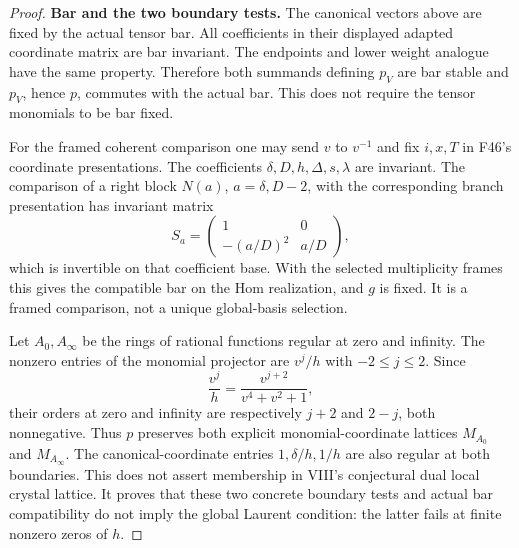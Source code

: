 \documentclass[11pt,a4paper]{article}
\newcommand{\fid}[1]{\textsf{#1}}\newcommand{\gate}[1]{\textsf{#1}}
\theoremstyle{named}\newtheorem{finding}{Finding}[section]
\theoremstyle{definition}\newtheorem{definition}[finding]{Definition}
\theoremstyle{remark}\newtheorem{remark}[finding]{Remark}
\begin{document}
\begin{proof}
\par\smallskip\noindent\textbf{Bar and the two boundary tests.}\quad
The canonical vectors above are fixed by the actual tensor bar.
All coefficients in their displayed adapted coordinate matrix
are bar invariant. The endpoints and lower weight analogue
have the same property. Therefore both summands defining $p_V$
are bar stable and $p_V$, hence $p$, commutes with the actual bar.
This does not require the tensor monomials to be bar fixed.

For the framed coherent comparison one may send $v$ to $v^{-1}$
and fix $i,x,T$ in \fid{F46}'s coordinate presentations.
The coefficients $\delta,D,h,\Delta,s,\lambda$ are invariant.
The comparison of a right block $N(a)$, $a=\delta,D-2$, with
the corresponding branch presentation has invariant matrix
\[
 S_a=\begin{pmatrix}1&0\\-(a/D)^2&a/D\end{pmatrix},
\]
which is invertible on that coefficient base.
With the selected multiplicity frames this gives the compatible
bar on the Hom realization, and $g$ is fixed.
It is a framed comparison, not a unique global-basis selection.

Let $A_0,A_\infty$ be the rings of rational functions regular
at zero and infinity. The nonzero entries of the monomial
projector are $v^j/h$ with $-2\leq j\leq2$.
Since
\[
 \frac{v^j}{h}=\frac{v^{j+2}}{v^4+v^2+1},
\]
their orders at zero and infinity are respectively $j+2$
and $2-j$, both nonnegative. Thus $p$ preserves both explicit
monomial-coordinate lattices $M_{A_0}$ and $M_{A_\infty}$.
The canonical-coordinate entries $1,\delta/h,1/h$ are also
regular at both boundaries.
This does not assert membership in VIII's conjectural dual
local crystal lattice. It proves that these two concrete
boundary tests and actual bar compatibility do not imply
the global Laurent condition: the latter fails at finite
nonzero zeros of $h$.


\end{proof}
\end{document}

